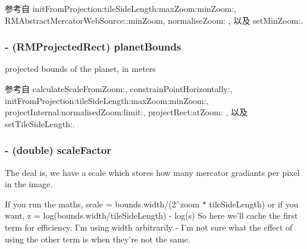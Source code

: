 参考自 init\-From\-Projection\-:tile\-Side\-Length\-:max\-Zoom\-:min\-Zoom\-:, R\-M\-Abstract\-Mercator\-Web\-Source\-::min\-Zoom, normalise\-Zoom\-: , 以及 set\-Min\-Zoom\-:.

\hypertarget{interface_r_m_fractal_tile_projection_a5f3e841cee4a8573bfc60a6ec8a35884}{
\subsubsection[{planet\-Bounds}]{\setlength{\rightskip}{0pt plus 5cm}-\/ ({\bf R\-M\-Projected\-Rect}) planet\-Bounds\hspace{0.3cm}{\ttfamily [protected]}}}\label{interface_r_m_fractal_tile_projection_a5f3e841cee4a8573bfc60a6ec8a35884}


projected bounds of the planet, in meters 



参考自 calculate\-Scale\-From\-Zoom\-:, constrain\-Point\-Horizontally\-:, init\-From\-Projection\-:tile\-Side\-Length\-:max\-Zoom\-:min\-Zoom\-:, project\-Internal\-:normalised\-Zoom\-:limit\-:, project\-Rect\-:at\-Zoom\-: , 以及 set\-Tile\-Side\-Length\-:.

\hypertarget{interface_r_m_fractal_tile_projection_a297753455c83bc2d681dad601fb7a9c5}{
\subsubsection[{scale\-Factor}]{\setlength{\rightskip}{0pt plus 5cm}-\/ (double) scale\-Factor\hspace{0.3cm}{\ttfamily [protected]}}}\label{interface_r_m_fractal_tile_projection_a297753455c83bc2d681dad601fb7a9c5}


The deal is, we have a scale which stores how many mercator gradiants per pixel in the image. 

If you run the maths, scale = bounds.\-width/(2$^\wedge$zoom $\ast$ tile\-Side\-Length) or if you want, z = log(bounds.\-width/tile\-Side\-Length) -\/ log(s) So here we'll cache the first term for efficiency. I'm using width arbitrarily -\/ I'm not sure what the effect of using the other term is when they're not the same. 

